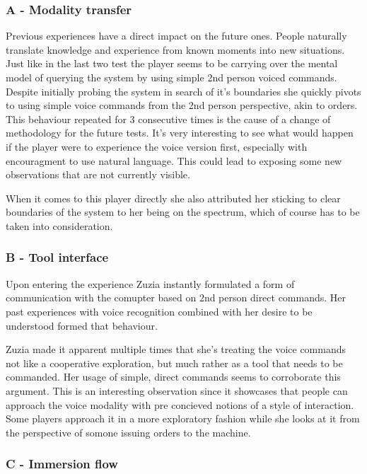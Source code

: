 \subsubsection{A - Modality transfer}


Previous experiences have a direct impact on the future ones. People naturally translate knowledge and experience from known moments into new situations.
Just like in the last two test the player seems to be carrying over the mental model of querying the system by using simple 2nd person voiced commands. Despite initially probing the system in search of it's boundaries she quickly pivots to using simple voice commands from the 2nd person perspective, akin to orders. This behaviour repeated for 3 consecutive times is the cause of a change of methodology for the future tests. It's very interesting to see what would happen if the player were to experience the voice version first, especially with encouragment to use natural language. This could lead to exposing some new observations that are not currently visible. 

When it comes to this player directly she also attributed her sticking to clear boundaries of the system to her being on the spectrum, which of course has to be taken into consideration.



\subsubsection{B - Tool interface}


Upon entering the experience Zuzia instantly formulated a form of communication with the comupter based on 2nd person direct commands. Her past experiences with voice recognition combined with her desire to be understood formed that behaviour. 

Zuzia made it apparent multiple times that she's treating the voice commands not like a cooperative exploration, but much rather as a tool that needs to be commanded. Her usage of simple, direct commands seems to corroborate this argument. This is an interesting observation since it showcases that people can approach the voice modality with pre concieved notions of a style of interaction. Some players approach it in a more exploratory fashion while she looks at it from the perspective of somone issuing orders to the machine. 


\subsubsection{C - Immersion flow}

